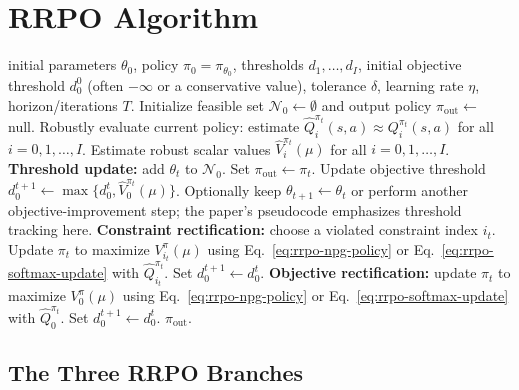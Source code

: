 \documentclass[11pt]{article}
\newcommand{\1}{\mathbf 1}
\begin{document}
\section{RRPO Algorithm}
\begin{algorithm}[H]
\caption{Rectified Robust Policy Optimization (RRPO)}
\label{alg:rrpo}
\begin{algorithmic}[1]
\Require initial parameters $\theta_0$, policy $\pi_0=\pi_{\theta_0}$, thresholds $d_1,\ldots,d_I$, initial objective threshold $d_0^0$ (often $-\infty$ or a conservative value), tolerance $\delta$, learning rate $\eta$, horizon/iterations $T$.
\State Initialize feasible set $\mathcal N_0\gets\emptyset$ and output policy $\pi_{\mathrm{out}}\gets$ null.
    \State Robustly evaluate current policy: estimate $\widehat Q_i^{\pi_t}(s,a)\approx Q_i^{\pi_t}(s,a)$ for all $i=0,1,\ldots,I$.
    \State Estimate robust scalar values $\widehat V_i^{\pi_t}(\mu)$ for all $i=0,1,\ldots,I$.
        \State \textbf{Threshold update:} add $\theta_t$ to $\mathcal N_0$.
            \State Set $\pi_{\mathrm{out}}\gets\pi_t$.
        \EndIf
        \State Update objective threshold $d_0^{t+1}\gets \max\{d_0^t,\widehat V_0^{\pi_t}(\mu)\}$.
        \State Optionally keep $\theta_{t+1}\gets\theta_t$ or perform another objective-improvement step; the paper's pseudocode emphasizes threshold tracking here.
        \State \textbf{Constraint rectification:} choose a violated constraint index $i_t$.
        \State Update $\pi_t$ to maximize $V_{i_t}^{\pi}(\mu)$ using Eq.~\eqref{eq:rrpo-npg-policy} or Eq.~\eqref{eq:rrpo-softmax-update} with $\widehat Q_{i_t}^{\pi_t}$.
        \State Set $d_0^{t+1}\gets d_0^t$.
        \State \textbf{Objective rectification:} update $\pi_t$ to maximize $V_0^{\pi}(\mu)$ using Eq.~\eqref{eq:rrpo-npg-policy} or Eq.~\eqref{eq:rrpo-softmax-update} with $\widehat Q_0^{\pi_t}$.
        \State Set $d_0^{t+1}\gets d_0^t$.
    \EndIf
\EndFor
\State \Return $\pi_{\mathrm{out}}$.
\end{algorithmic}
\end{algorithm}

\subsection{The Three RRPO Branches}
\end{document}
